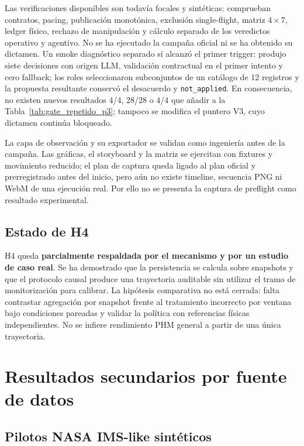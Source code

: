 Las verificaciones disponibles son todavía focales y sintéticas: comprueban
contratos, pacing, publicación monotónica, exclusión single-flight, matriz
$4\times7$, ledger físico, rechazo de manipulación y cálculo separado de los
veredictos operativo y agentivo. No se ha ejecutado la campaña oficial ni se
ha obtenido su dictamen. Un smoke diagnóstico separado sí alcanzó el primer
trigger: produjo siete decisiones con origen LLM, validación contractual en el
primer intento y cero fallback; los roles seleccionaron subconjuntos de un
catálogo de 12 registros y la propuesta resultante conservó el desacuerdo y
\texttt{not\_applied}. En consecuencia, no existen nuevos
resultados 4/4, 28/28 o 4/4 que añadir a la Tabla~\ref{tab:gate_repetido_p3};
tampoco se modifica el puntero V3, cuyo dictamen continúa bloqueado.

La capa de observación y su exportador se validan como ingeniería antes de la
campaña. Las gráficas, el storyboard y la matriz se ejercitan con fixtures y
movimiento reducido; el plan de captura queda ligado al plan oficial y
prerregistrado antes del inicio, pero aún no existe timeline, secuencia PNG ni
WebM de una ejecución real. Por ello no se presenta la captura de preflight como
resultado experimental.

\subsection{Estado de H4}

H4 queda \textbf{parcialmente respaldada por el mecanismo y por un estudio de
caso real}. Se ha demostrado que la persistencia se calcula sobre snapshots y
que el protocolo causal produce una trayectoria auditable sin utilizar el tramo
de monitorización para calibrar. La hipótesis comparativa no está cerrada: falta
contrastar agregación por snapshot frente al tratamiento incorrecto por ventana
bajo condiciones pareadas y validar la política con referencias físicas
independientes. No se infiere rendimiento PHM general a partir de una única
trayectoria.

\section{Resultados secundarios por fuente de datos}

\subsection{Pilotos NASA IMS-like sintéticos}


